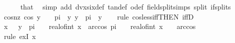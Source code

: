 \begin{isabellebody}
\ \ \ \ \isamarkupfalse%
\ that\ \isamarkupfalse%
\ {\isacharparenleft}{\kern0pt}simp\ add{\isacharcolon}{\kern0pt}\ dvxsix{\isacharunderscore}{\kern0pt}def\ tan{\isacharunderscore}{\kern0pt}def\ o{\isacharunderscore}{\kern0pt}def\ field{\isacharunderscore}{\kern0pt}split{\isacharunderscore}{\kern0pt}simps\ split{\isacharcolon}{\kern0pt}\ if{\isacharunderscore}{\kern0pt}splits{\isacharparenright}{\kern0pt}\isanewline
\isanewline
\ \ \isamarkupfalse%
\ cosnz{\isacharcolon}{\kern0pt}\ {\isachardoublequoteopen}cos\ {\isacharparenleft}{\kern0pt}{}{\isacharslash}{\kern0pt}y{\isacharparenright}{\kern0pt}\ {\isacharless}{\kern0pt}\ {}{\isachardoublequoteclose}\ \ {\isachardoublequoteopen}{}{\isacharslash}{\kern0pt}{\isacharparenleft}{\kern0pt}{}{\isacharasterisk}{\kern0pt}pi{\isacharparenright}{\kern0pt}\ {\isacharless}{\kern0pt}\ y{\isachardoublequoteclose}\ {\isachardoublequoteopen}y\ {\isacharless}{\kern0pt}\ {}{\isacharslash}{\kern0pt}pi{\isachardoublequoteclose}\ \ y\isanewline
\ \ \isamarkupfalse%
\ {\isacharparenleft}{\kern0pt}rule\ cos{\isacharunderscore}{\kern0pt}less{\isacharunderscore}{\kern0pt}iff{\isacharbrackleft}{\kern0pt}THEN\ iffD{}{\isacharbrackright}{\kern0pt}{\isacharparenright}{\kern0pt}\isanewline
\ \ \ \ \isamarkupfalse%
\ {\isachardoublequoteopen}{\isasymexists}x{\isachardot}{\kern0pt}\ {}\ {\isacharslash}{\kern0pt}\ y\ {\isasymin}\ {\isacharbraceleft}{\kern0pt}pi\ {\isacharasterisk}{\kern0pt}\ {\isacharparenleft}{\kern0pt}{}\ {\isacharasterisk}{\kern0pt}\ real{\isacharunderscore}{\kern0pt}of{\isacharunderscore}{\kern0pt}int\ x{\isacharparenright}{\kern0pt}\ {\isacharplus}{\kern0pt}\ arccos\ {}{\isacharless}{\kern0pt}{\isachardot}{\kern0pt}{\isachardot}{\kern0pt}{\isacharless}{\kern0pt}pi\ {\isacharasterisk}{\kern0pt}\ {\isacharparenleft}{\kern0pt}{}\ {\isacharasterisk}{\kern0pt}\ {\isacharparenleft}{\kern0pt}real{\isacharunderscore}{\kern0pt}of{\isacharunderscore}{\kern0pt}int\ x\ {\isacharplus}{\kern0pt}\ {}{\isacharparenright}{\kern0pt}{\isacharparenright}{\kern0pt}\ {\isacharminus}{\kern0pt}\ arccos\ {}{\isacharbraceright}{\kern0pt}{\isachardoublequoteclose}\ \isanewline
\ \ \ \ \isamarkupfalse%
\ {\isacharparenleft}{\kern0pt}rule\ exI{\isacharbrackleft}{\kern0pt}\ {\isacharquery}{\kern0pt}x\ {\isacharequal}{\kern0pt}\ {}{\isacharbrackright}{\kern0pt}{\isacharparenright}{\kern0pt}\isanewline

\end{isabellebody}
